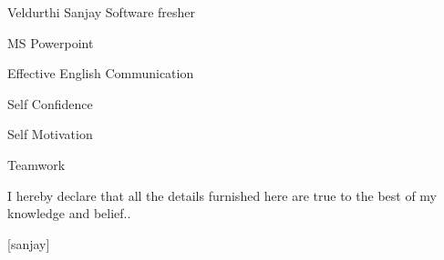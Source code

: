 \documentclass{article}
\begin{document}
\begin{cv}{Veldurthi Sanjay }{Software fresher}
\cvseparator
\begin{cvitem}
    MS Powerpoint
\end{cvitem}

\cvseparator
\begin{cvitem}
    Effective English Communication
\end{cvitem}

\cvseparator
\begin{cvitem}
    Self Confidence
\end{cvitem}

\cvseparator
\begin{cvitem}
    Self Motivation
\end{cvitem}
\cvseparator
\begin{cvitem}
    Teamwork
\end{cvitem}




 \end{cv}
 

     I hereby declare that all the details furnished here are true to the best of my knowledge and belief..
                                                 
                                                 [sanjay]
\end{document}
